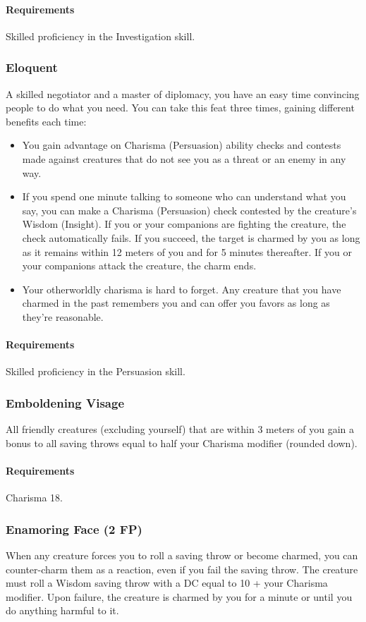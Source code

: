     \paragraph{Requirements} Skilled proficiency in the Investigation skill.
\subsubsection{Eloquent} \label{feat::eloquent}
    A skilled negotiator and a master of diplomacy, you have an easy time convincing people to do what you need.
    You can take this feat three times, gaining different benefits each time:
    \begin{itemize}
        \item You gain advantage on Charisma (Persuasion) ability checks and contests made against creatures that do not see you as a threat or an enemy in any way.
        \item If you spend one minute talking to someone who can understand what you say, you can make a Charisma (Persuasion) check contested by the creature's Wisdom (Insight).
        If you or your companions are fighting the creature, the check automatically fails.
        If you succeed, the target is charmed by you as long as it remains within 12 meters of you and for 5 minutes thereafter.
        If you or your companions attack the creature, the charm ends.
        \item Your otherworldly charisma is hard to forget.
        Any creature that you have charmed in the past remembers you and can offer you favors as long as they're reasonable.
    \end{itemize}
    \paragraph{Requirements} Skilled proficiency in the Persuasion skill.
\subsubsection{Emboldening Visage} \label{feat::emboldeningvisage}
    All friendly creatures (excluding yourself) that are within 3 meters of you gain a bonus to all saving throws equal to half your Charisma modifier (rounded down).
    \paragraph{Requirements} Charisma 18.
\subsubsection{Enamoring Face (2 FP)} \label{feat::enamoringface}
    When any creature forces you to roll a saving throw or become charmed, you can counter-charm them as a reaction, even if you fail the saving throw.
    The creature must roll a Wisdom saving throw with a DC equal to 10 + your Charisma modifier.
    Upon failure, the creature is charmed by you for a minute or until you do anything harmful to it.

